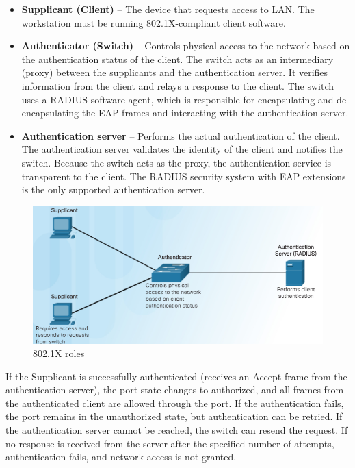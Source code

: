 \begin{itemize}
\item \textbf{Supplicant (Client)} -- The device that requests access to LAN. The workstation must be running 802.1X-compliant client software. 
\item \textbf{Authenticator (Switch)} -- Controls physical access to the network based on the authentication status of the client. The switch acts as an intermediary (proxy) between the supplicants and the authentication server. It verifies information from the client and relays a response to the client. The switch uses a RADIUS software agent, which is responsible for encapsulating and de-encapsulating the EAP frames and interacting with the authentication server.
\item \textbf{Authentication server} -- Performs the actual authentication of the client. The authentication server validates the identity of the client and notifies the switch. Because the switch acts as the proxy, the authentication service is transparent to the client. The RADIUS security system with EAP extensions is the only supported authentication server.
\end{itemize}

\begin{figure}[hbtp]
\caption{802.1X roles}\label{802.1X}
\centering
\includegraphics[scale=0.7]{pictures/8021X.PNG}
\end{figure}

If the Supplicant is successfully authenticated (receives an Accept frame from the authentication server), the port state changes to authorized, and all frames from the authenticated client are allowed through the port. If the authentication fails, the port remains in the unauthorized state, but authentication can be retried. If the authentication server cannot be reached, the switch can resend the request. If no response is received from the server after the specified number of attempts, authentication fails, and network access is not granted.

